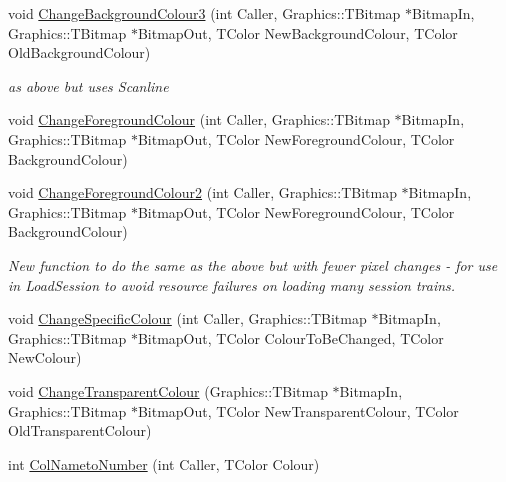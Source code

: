 \begin{DoxyCompactItemize}
\mbox{\label{class_t_rail_graphics_af83b21217bb1c2a229bdf14b0d2ffd0d}} 
void \mbox{\hyperlink{class_t_rail_graphics_af83b21217bb1c2a229bdf14b0d2ffd0d}{Change\+Background\+Colour3}} (int Caller, Graphics\+::\+T\+Bitmap $\ast$Bitmap\+In, Graphics\+::\+T\+Bitmap $\ast$Bitmap\+Out, T\+Color New\+Background\+Colour, T\+Color Old\+Background\+Colour)
\begin{DoxyCompactList}\small\item\em as above but uses Scanline \end{DoxyCompactList}\item 
void \mbox{\hyperlink{class_t_rail_graphics_aa2dace651659e084ec23c9961f5819b1}{Change\+Foreground\+Colour}} (int Caller, Graphics\+::\+T\+Bitmap $\ast$Bitmap\+In, Graphics\+::\+T\+Bitmap $\ast$Bitmap\+Out, T\+Color New\+Foreground\+Colour, T\+Color Background\+Colour)
\item 
\mbox{\label{class_t_rail_graphics_ad6db946801b17d5d4b462bc2c95ebfbd}} 
void \mbox{\hyperlink{class_t_rail_graphics_ad6db946801b17d5d4b462bc2c95ebfbd}{Change\+Foreground\+Colour2}} (int Caller, Graphics\+::\+T\+Bitmap $\ast$Bitmap\+In, Graphics\+::\+T\+Bitmap $\ast$Bitmap\+Out, T\+Color New\+Foreground\+Colour, T\+Color Background\+Colour)
\begin{DoxyCompactList}\small\item\em New function to do the same as the above but with fewer pixel changes -\/ for use in Load\+Session to avoid resource failures on loading many session trains. \end{DoxyCompactList}\item 
void \mbox{\hyperlink{class_t_rail_graphics_ac4e48e6ee19e01724adb0d490762d548}{Change\+Specific\+Colour}} (int Caller, Graphics\+::\+T\+Bitmap $\ast$Bitmap\+In, Graphics\+::\+T\+Bitmap $\ast$Bitmap\+Out, T\+Color Colour\+To\+Be\+Changed, T\+Color New\+Colour)
\item 
void \mbox{\hyperlink{class_t_rail_graphics_a89a3e3a91129c4d02f4606478781b519}{Change\+Transparent\+Colour}} (Graphics\+::\+T\+Bitmap $\ast$Bitmap\+In, Graphics\+::\+T\+Bitmap $\ast$Bitmap\+Out, T\+Color New\+Transparent\+Colour, T\+Color Old\+Transparent\+Colour)
\item 
\mbox{\label{class_t_rail_graphics_a654ae6c6b77e20d1625f1e52d04d9d69}} 
int \mbox{\hyperlink{class_t_rail_graphics_a654ae6c6b77e20d1625f1e52d04d9d69}{Col\+Nameto\+Number}} (int Caller, T\+Color Colour)

\end{DoxyCompactItemize}
